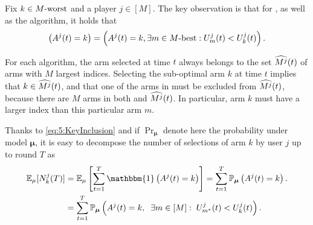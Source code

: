 \begin{smallproof}
  Fix $k\in M\text{-}\mathrm{worst}$ and a player $j \in [M]$.
  The key observation is that for \MCTopM, \RandTopM{} as well as the \rhoRand{} algorithm, it holds that
  \begin{equation}\label{eq:5:KeyInclusion}
    \left(A^j(t) = k\right) = \left(A^j(t) = k , \exists m \in M\text{-}\mathrm{best} : U_m^j(t) < U_k^j(t) \right).
  \end{equation}

  For each algorithm, the arm selected at time $t$ always belongs to the set $\widehat{M^j}(t)$ of arms with $M$ largest indices.
  Selecting the sub-optimal arm $k$ at time $t$ implies that $k \in \widehat{M^j}(t)$, and that one of the arms in \Mbest{} must be excluded from $\widehat{M^j}(t)$, because there are $M$ arms in both \Mbest{} and $\widehat{M^j}(t)$.
  In particular, arm $k$ must have a larger index than this particular arm $m$.

  Thanks to \eqref{eq:5:KeyInclusion} and if $\Pr_{\bm{\mu}} $ denote here the probability under model $\bm{\mu}$, it is easy to decompose the number of selections of arm $k$ by user $j$ up to round $T$ as
  \begin{align*}
  \E_{\mu}[N_k^j(T)]
  &= \E_{\mu}\left[ \sum_{t=1}^T \mathbbm{1}\left( A^j(t) = k \right) \right]
  = \sum_{t=1}^T \Pr_{\bm{\mu}} \left( A^j(t) = k \right).\\
  &= \sum_{t=1}^T \Pr_{\bm{\mu}} \left( A^j(t) = k,\;\; \exists m \in[M]:\; U_{m^*}^j(t) < U_k^j(t) \right).
  \end{align*}


\end{smallproof}
